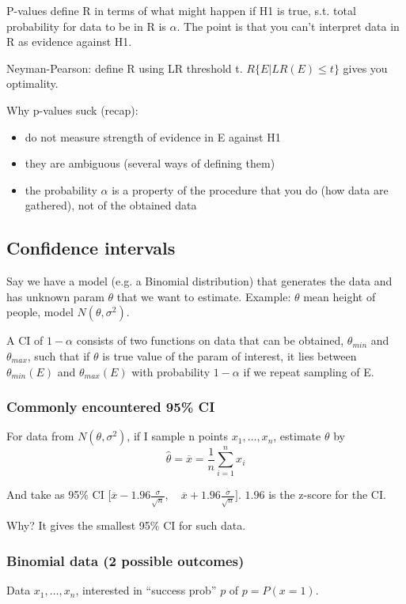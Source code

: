 \documentclass[12pt,a4paper,oneside,fleqn]{article}
\begin{document}
P-values define R in terms of what might happen if H1 is true, s.t. total probability for data to be in R is $\alpha$.
The point is that you can't interpret data in R as evidence against H1.

Neyman-Pearson: define R using LR threshold t. $R \{ E | LR(E) \leq t\}$ gives you optimality.

Why p-values suck (recap):

\begin{itemize}
  \item do not measure strength of evidence in E against H1
  \item they are ambiguous (several ways of defining them)
  \item the probability $\alpha$ is a property of the procedure that you do (how data are gathered), not of the obtained data
\end{itemize}

\subsection{Confidence intervals}
Say we have a model (e.g. a Binomial distribution) that generates the data and has unknown param $\theta$ that we want to estimate.
Example: $\theta$ mean height of people, model $N(\theta, \sigma^2)$.

A CI of $1-\alpha$ consists of two functions on data that can be obtained, $\theta_{min}$ and $\theta_{max}$, such that if $\theta$ is true value of the param of interest, it lies between $\theta_{min} (E)$ and $\theta_{max} (E)$ with probability $1-\alpha$ if we repeat sampling of E.

\subsubsection{Commonly encountered 95\% CI}
For data from $N(\theta, \sigma^2)$, if I sample n points $x_1,\ldots,x_n$, estimate $\theta$ by \[
  \hat{\theta} = \overline{x} = \frac{1}{n} \sum_{i=1}^n x_i
\]

And take as 95\% CI $\big[ \overline{x} - 1.96 \frac{\sigma}{\sqrt{n}}, \quad \overline{x} + 1.96 \frac{\sigma}{\sqrt{n}} \big]$.
$1.96$ is the z-score for the CI.

Why? It gives the smallest 95\% CI for such data.

\subsubsection{Binomial data (2 possible outcomes)}
Data $x_1,\ldots,x_n$, interested in ``success prob'' $p$ of $p = P(x = 1)$.
\end{document}
